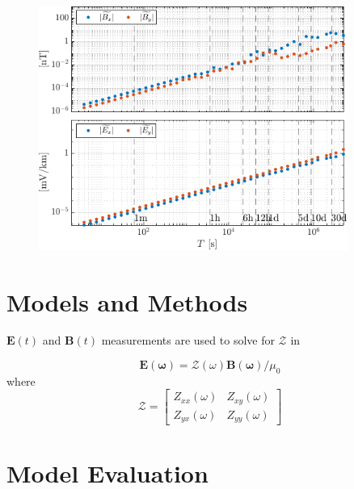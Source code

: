 \documentclass[draft,linenumbers]{agujournal2018}
\begin{document}
\begin{figure}[b]
  \centering
  \includegraphics[width=0.9\textwidth]{figures/dftplot-original-averaged-magnitudes-Middelpos-tf1.pdf}
  \caption{}
  \label{fig:dft}
\end{figure}

\clearpage

\section{Models and Methods}
\label{section:Models_and_Methods}

$\mathbf{E}(t)$ and $\mathbf{B}(t)$ measurements are used to solve for $\mathcal{Z}$ in

\begin{linenomath*}
    \begin{equation}
    \mathbf{E(\omega)} = \mathcal{Z(\omega)}\mathbf{B(\omega)}/\mu_0
    \end{equation}
    \noindent where
    \begin{equation}
    \mathcal{Z} = 
    \begin{bmatrix}
    Z_{xx}(\omega) & Z_{xy}(\omega)\\
    Z_{yx}(\omega) & Z_{yy}(\omega)
    \end{bmatrix}
    \end{equation}
    \end{linenomath*}

\noindent

\section{Model Evaluation}
\label{section:Model_Evaluation}
\end{document}
